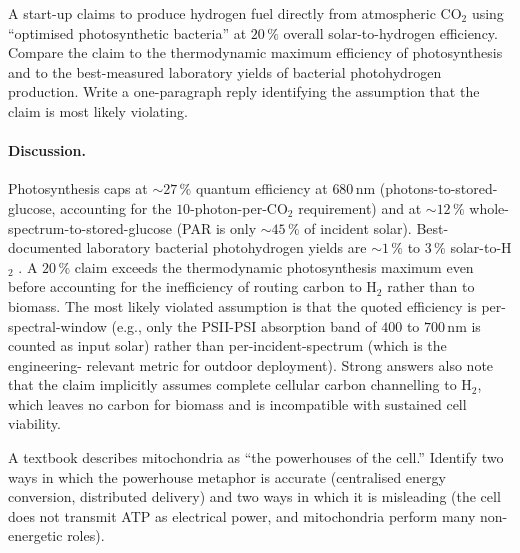 \begin{exercise}
A start-up claims to produce hydrogen fuel directly from atmospheric
CO$_2$ using ``optimised photosynthetic bacteria'' at $20\,\%$
overall solar-to-hydrogen efficiency. Compare the claim to the
thermodynamic maximum efficiency of photosynthesis and to the
best-measured laboratory yields of bacterial photohydrogen
production. Write a one-paragraph reply identifying the assumption
that the claim is most likely violating.
\end{exercise}

\paragraph{Discussion.}
Photosynthesis caps at $\sim 27\,\%$ quantum efficiency at $680\,\text{nm}$
(photons-to-stored-glucose, accounting for the $10$-photon-per-CO$_2$
requirement) and at $\sim 12\,\%$ whole-spectrum-to-stored-glucose
(PAR is only $\sim 45\,\%$ of incident solar). Best-documented
laboratory bacterial photohydrogen yields are $\sim 1\,\%$ to $3\,\%$
solar-to-H$_2$ \cite{paper:v6c02-zhu-photosynthesis-2010}. A $20\,\%$
claim exceeds the thermodynamic photosynthesis maximum even before
accounting for the inefficiency of routing carbon to H$_2$ rather
than to biomass. The most likely violated assumption is that the
quoted efficiency is per-spectral-window (e.g., only the PSII-PSI
absorption band of $400$ to $700\,\text{nm}$ is counted as input
solar) rather than per-incident-spectrum (which is the engineering-
relevant metric for outdoor deployment). Strong answers also note
that the claim implicitly assumes complete cellular carbon channelling
to H$_2$, which leaves no carbon for biomass and is incompatible with
sustained cell viability.

\begin{exercise}
A textbook describes mitochondria as ``the powerhouses of the cell.''
Identify two ways in which the powerhouse metaphor is accurate
(centralised energy conversion, distributed delivery) and two ways in
which it is misleading (the cell does not transmit ATP as electrical
power, and mitochondria perform many non-energetic roles).
\end{exercise}


